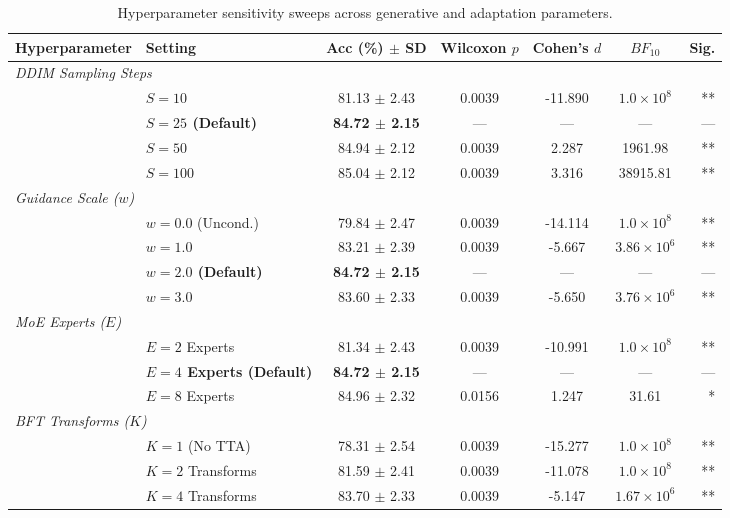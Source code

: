 \begin{table}[t]
\centering
\small
\caption{Hyperparameter sensitivity sweeps across generative and adaptation parameters.}
\label{tab:paper2_sensitivity}
\begin{tabular}{llccccr}
\toprule
\textbf{Hyperparameter} & \textbf{Setting} & \textbf{Acc (\%) $\pm$ SD} & \textbf{Wilcoxon $p$} & \textbf{Cohen's $d$} & \textbf{$BF_{10}$} & \textbf{Sig.} \\
\midrule
\multicolumn{7}{l}{\textit{DDIM Sampling Steps}} \\
  & $S = 10$ & 81.13 $\pm$ 2.43 & 0.0039 & -11.890 & $1.0\times 10^8$ & ** \\
  & \textbf{$S = 25$ (Default)} & \textbf{84.72 $\pm$ 2.15} & --- & --- & --- & --- \\
  & $S = 50$ & 84.94 $\pm$ 2.12 & 0.0039 & 2.287 & 1961.98 & ** \\
  & $S = 100$ & 85.04 $\pm$ 2.12 & 0.0039 & 3.316 & 38915.81 & ** \\
\midrule
\multicolumn{7}{l}{\textit{Guidance Scale ($w$)}} \\
  & $w = 0.0$ (Uncond.) & 79.84 $\pm$ 2.47 & 0.0039 & -14.114 & $1.0\times 10^8$ & ** \\
  & $w = 1.0$ & 83.21 $\pm$ 2.39 & 0.0039 & -5.667 & $3.86\times 10^6$ & ** \\
  & \textbf{$w = 2.0$ (Default)} & \textbf{84.72 $\pm$ 2.15} & --- & --- & --- & --- \\
  & $w = 3.0$ & 83.60 $\pm$ 2.33 & 0.0039 & -5.650 & $3.76\times 10^6$ & ** \\
\midrule
\multicolumn{7}{l}{\textit{MoE Experts ($E$)}} \\
  & $E = 2$ Experts & 81.34 $\pm$ 2.43 & 0.0039 & -10.991 & $1.0\times 10^8$ & ** \\
  & \textbf{$E = 4$ Experts (Default)} & \textbf{84.72 $\pm$ 2.15} & --- & --- & --- & --- \\
  & $E = 8$ Experts & 84.96 $\pm$ 2.32 & 0.0156 & 1.247 & 31.61 & * \\
\midrule
\multicolumn{7}{l}{\textit{BFT Transforms ($K$)}} \\
  & $K = 1$ (No TTA) & 78.31 $\pm$ 2.54 & 0.0039 & -15.277 & $1.0\times 10^8$ & ** \\
  & $K = 2$ Transforms & 81.59 $\pm$ 2.41 & 0.0039 & -11.078 & $1.0\times 10^8$ & ** \\
  & $K = 4$ Transforms & 83.70 $\pm$ 2.33 & 0.0039 & -5.147 & $1.67\times 10^6$ & ** \\

\end{tabular}
\end{table}
